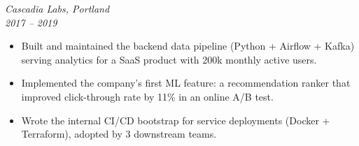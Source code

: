 \medskip

\noindent
\textbf{}
\hfill
\textit{Cascadia Labs, Portland}\\[2pt]
\textit{2017 -- 2019}
\begin{itemize}[leftmargin=1.5em, topsep=4pt, itemsep=2pt]
  \item Built and maintained the backend data pipeline (Python + Airflow + Kafka) serving analytics for a SaaS product with 200k monthly active users.
  \item Implemented the company's first ML feature: a recommendation ranker that improved click-through rate by 11\% in an online A/B test.
  \item Wrote the internal CI/CD bootstrap for service deployments (Docker + Terraform), adopted by 3 downstream teams.
\end{itemize}
